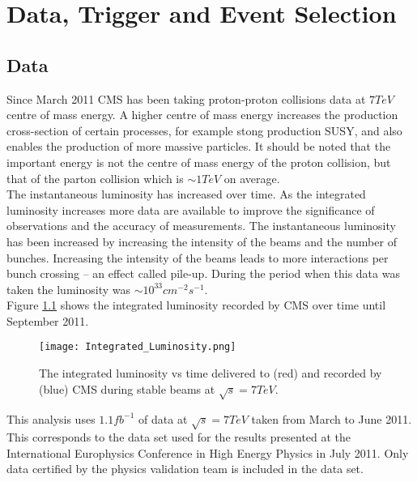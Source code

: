\chapter{Data, Trigger and Event Selection}

\section{Data}

Since March 2011 CMS has been taking proton-proton collisions data at $7
\unit{TeV}$ centre of mass energy. A higher centre of mass energy increases the 
production cross-section of certain processes, for example stong production 
SUSY, and also enables the production of more massive particles. It should be 
noted that the important energy is not the centre of mass energy of the proton 
collision, but that of the parton collision which is $\sim 1 \unit{TeV}$ on 
average. \\

The instantaneous luminosity has increased over time. As the integrated 
luminosity increases more data are available to improve the significance of 
observations and the accuracy of measurements. The instantaneous luminosity has 
been increased by increasing the intensity of the beams and the number of 
bunches. Increasing the intensity of the beams leads to more interactions per 
bunch crossing -- an effect called pile-up. During the period when this data was 
taken the luminosity was $\sim 10^{33} \unit{cm^{-2}s^{-1}}$. \\

Figure \ref{fig:intlumi} shows the integrated luminosity recorded by CMS over 
time until September 2011. \\

\begin{figure}
\begin{center}
\texttt{[image: Integrated\_Luminosity.png]}
\caption{The integrated luminosity vs time delivered to (red) and recorded by
(blue) CMS during stable beams at $\sqrt{s} = 7 \unit{TeV}$.}
\end{center}
\label{fig:intlumi}
\end{figure}

This analysis uses $1.1 \unit{fb^{-1}}$ of data at $\sqrt{s} = 7 \unit{TeV}$ taken from 
March to June 2011. This corresponds to the data set used for the results
presented at the International Europhysics Conference in High Energy Physics in 
July 2011. Only data certified by the physics validation team is included in the 
data set. \\

